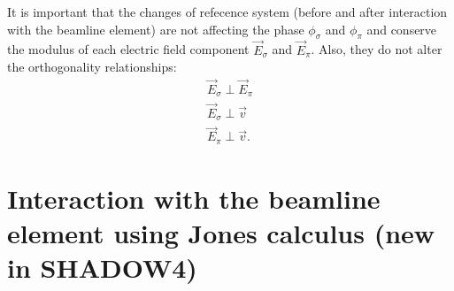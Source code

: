 \documentclass{iucr}
\begin{document}






It is important that the changes of refecence system (before and after interaction with the beamline element)  are not affecting the phase $\phi_\sigma$ and $\phi_\pi$ and conserve the modulus of each electric field component $\vec{E}_\sigma$ and $\vec{E}_\pi$. Also, they do not alter the orthogonality relationships:
\begin{eqnarray}
\label{ortho}
\vec{E}_\sigma \perp \vec{E}_\pi \nonumber \\
\vec{E}_\sigma \perp \vec{v} \nonumber \\
\vec{E}_\pi \perp \vec{v}.
\end{eqnarray}



\section{Interaction with the beamline element using Jones calculus (new in SHADOW4)}
\label{sec:S4}
\end{document}
